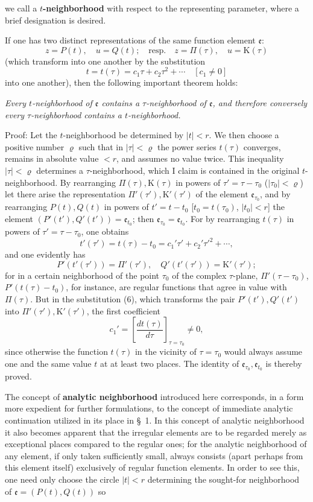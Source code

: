 \documentclass{article}
\begin{document}
we call a \textbf{$t$-neighborhood} with respect to the representing parameter, where a brief designation is desired.

If one has two distinct representations of the same function element $\mathfrak{e}$:
\[ z = P(t), \quad u = Q(t); \quad \text{resp.} \quad z = \Pi(\tau), \quad u = \mathrm{K}(\tau) \]
(which transform into one another by the substitution
\[ t = t(\tau) = c_1 \tau + c_2 \tau^2 + \cdots \quad [c_1 \neq 0] \]
into one another), then the following important theorem holds:

\emph{Every $t$-neighborhood of $\mathfrak{e}$ contains a $\tau$-neighborhood of $\mathfrak{e}$, and therefore conversely every $\tau$-neighborhood contains a $t$-neighborhood.}

Proof: Let the $t$-neighborhood be determined by $|t| < r$. We then choose a positive number $\varrho$ such that in $|\tau| < \varrho$ the power series $t(\tau)$ converges, remains in absolute value $< r$, and assumes no value twice. This inequality $|\tau| < \varrho$ determines a $\tau$-neighborhood, which I claim is contained in the original $t$-neighborhood. By rearranging $\Pi(\tau), \mathrm{K}(\tau)$ in powers of $\tau' = \tau - \tau_0$ ($|\tau_0| < \varrho$) let there arise the representation $\Pi'(\tau'), \mathrm{K}'(\tau')$ of the element $\mathfrak{e}_{\tau_0}$, and by rearranging $P(t), Q(t)$ in powers of $t' = t - t_0$ [$t_0 = t(\tau_0)$, $|t_0| < r$] the element $(P'(t'), Q'(t')) = \mathfrak{e}_{t_0}$; then $\mathfrak{e}_{\tau_0} = \mathfrak{e}_{t_0}$. For by rearranging $t(\tau)$ in powers of $\tau' = \tau - \tau_0$, one obtains
\[ t'(\tau') = t(\tau) - t_0 = c_1' \tau' + c_2' \tau'^2 + \cdots, \tag{6} \]
and one evidently has
\[ P'(t'(\tau')) = \Pi'(\tau'), \quad Q'(t'(\tau')) = \mathrm{K}'(\tau'); \]
for in a certain neighborhood of the point $\tau_0$ of the complex $\tau$-plane, $\Pi'(\tau - \tau_0)$, $P'(t(\tau) - t_0)$, for instance, are regular functions that agree in value with $\Pi(\tau)$. But in the substitution (6), which transforms the pair $P'(t'), Q'(t')$ into $\Pi'(\tau'), \mathrm{K}'(\tau')$, the first coefficient
\[ c_1' = \left[ \frac{dt(\tau)}{d\tau} \right]_{\tau = \tau_0} \neq 0, \]
since otherwise the function $t(\tau)$ in the vicinity of $\tau = \tau_0$ would always assume one and the same value $t$ at at least two places. The identity of $\mathfrak{e}_{\tau_0}, \mathfrak{e}_{t_0}$ is thereby proved.

The concept of \textbf{analytic neighborhood} introduced here corresponds, in a form more expedient for further formulations, to the concept of immediate analytic continuation utilized in its place in §~1. In this concept of analytic neighborhood it also becomes apparent that the irregular elements are to be regarded merely as exceptional places compared to the regular ones; for the analytic neighborhood of any element, if only taken sufficiently small, always consists (apart perhaps from this element itself) exclusively of regular function elements. In order to see this, one need only choose the circle $|t| < r$ determining the sought-for neighborhood of $\mathfrak{e} = (P(t), Q(t))$ so
\end{document}
